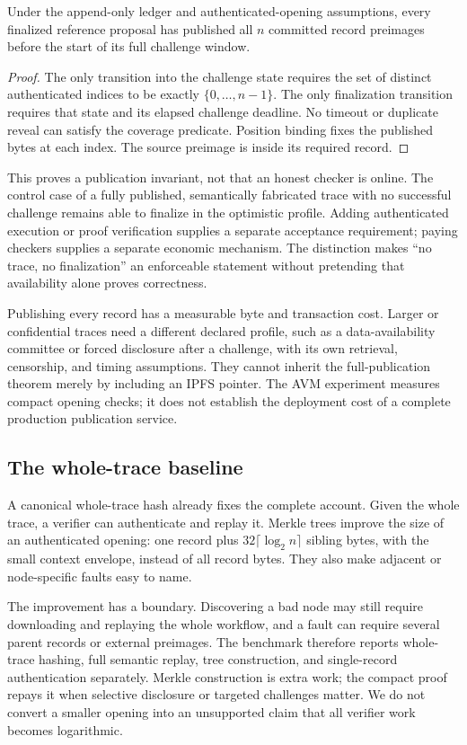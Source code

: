 \begin{proposition}
Under the append-only ledger and authenticated-opening assumptions, every finalized reference proposal has published all $n$ committed record preimages before the start of its full challenge window.
\end{proposition}
\begin{proof}
The only transition into the challenge state requires the set of distinct authenticated indices to be exactly $\{0,\ldots,n-1\}$. The only finalization transition requires that state and its elapsed challenge deadline. No timeout or duplicate reveal can satisfy the coverage predicate. Position binding fixes the published bytes at each index. The source preimage is inside its required record.
\end{proof}

This proves a publication invariant, not that an honest checker is online. The control case of a fully published, semantically fabricated trace with no successful challenge remains able to finalize in the optimistic profile. Adding authenticated execution or proof verification supplies a separate acceptance requirement; paying checkers supplies a separate economic mechanism. The distinction makes ``no trace, no finalization'' an enforceable statement without pretending that availability alone proves correctness.

Publishing every record has a measurable byte and transaction cost. Larger or confidential traces need a different declared profile, such as a data-availability committee or forced disclosure after a challenge, with its own retrieval, censorship, and timing assumptions. They cannot inherit the full-publication theorem merely by including an IPFS pointer. The AVM experiment measures compact opening checks; it does not establish the deployment cost of a complete production publication service.

\subsection{The whole-trace baseline}

A canonical whole-trace hash already fixes the complete account. Given the whole trace, a verifier can authenticate and replay it. Merkle trees improve the size of an authenticated opening: one record plus $32\lceil\log_2 n\rceil$ sibling bytes, with the small context envelope, instead of all record bytes. They also make adjacent or node-specific faults easy to name.

The improvement has a boundary. Discovering a bad node may still require downloading and replaying the whole workflow, and a fault can require several parent records or external preimages. The benchmark therefore reports whole-trace hashing, full semantic replay, tree construction, and single-record authentication separately. Merkle construction is extra work; the compact proof repays it when selective disclosure or targeted challenges matter. We do not convert a smaller opening into an unsupported claim that all verifier work becomes logarithmic.
